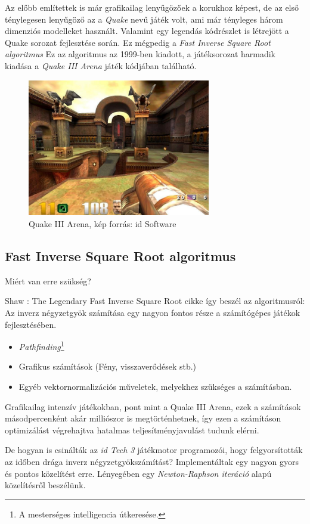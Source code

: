 \documentclass[]{thesis-ekf}
\theoremstyle{definition}
\begin{document}
	Az előbb említettek is már grafikailag lenyűgözőek a korukhoz képest, de az első ténylegesen lenyűgöző az a \emph{Quake} nevű játék volt, ami már tényleges három dimenziós modelleket használt.
	Valamint egy legendás kódrészlet is létrejött a Quake sorozat fejlesztése során. Ez mégpedig a \emph{Fast Inverse Square Root algoritmus}	Ez az algoritmus az 1999-ben kiadott, a játéksorozat harmadik kiadása a \emph{Quake III Arena} játék kódjában található.
	
	\begin{figure}[!ht]
		\label{kep:quake3}
		\centering
		\includegraphics[width=8cm]{quake3}
		\caption{Quake III Arena, kép forrás: id Software\cite{pic-quake3}}
	\end{figure}
	
	\subsection{Fast Inverse Square Root algoritmus}
	Miért van erre szükség?
	
	Shaw : The Legendary Fast Inverse Square Root cikke így beszél az algoritmusról\cite{FISR}:	
	Az inverz négyzetgyök számítása egy nagyon fontos része a számítógépes játékok fejlesztésében.
	\begin{itemize}
		\item \emph{Pathfinding}\footnote{A mesterséges intelligencia útkeresése.}
		\item Grafikus számítások (Fény, visszaverődések stb.)
		\item Egyéb vektornormalizációs műveletek, melyekhez szükséges a számításban.
	\end{itemize}
	Grafikailag intenzív játékokban, pont mint a Quake III Arena, ezek a számítások másodpercenként akár milliószor is megtörténhetnek, így ezen a számításon optimizálást végrehajtva hatalmas teljesítményjavulást tudunk elérni.
	
	De hogyan is csinálták az \emph{id Tech 3} játékmotor programozói, hogy felgyorsították az időben drága inverz négyzetgyökszámítást?
	Implementáltak egy nagyon gyors és pontos közelítést erre.
	Lényegében egy \emph{Newton-Raphson iteráció} alapú közelítésről beszélünk.
	
\end{document}
